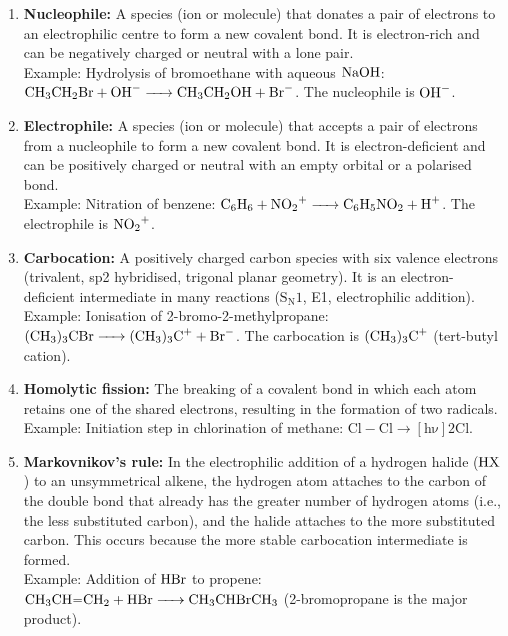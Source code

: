 \documentclass[11pt]{article}
\begin{document}
\begin{corrige}
\begin{enumerate}
\item \textbf{Nucleophile:} A species (ion or molecule) that donates a pair of electrons to an electrophilic centre to form a new covalent bond. It is electron-rich and can be negatively charged or neutral with a lone pair. \\
Example: Hydrolysis of bromoethane with aqueous \(\ce{NaOH}\): \(\ce{CH3CH2Br + OH- -> CH3CH2OH + Br-}\). The nucleophile is \(\ce{OH-}\).

\item \textbf{Electrophile:} A species (ion or molecule) that accepts a pair of electrons from a nucleophile to form a new covalent bond. It is electron-deficient and can be positively charged or neutral with an empty orbital or a polarised bond. \\
Example: Nitration of benzene: \(\ce{C6H6 + NO2+ -> C6H5NO2 + H+}\). The electrophile is \(\ce{NO2+}\).

\item \textbf{Carbocation:} A positively charged carbon species with six valence electrons (trivalent, sp2 hybridised, trigonal planar geometry). It is an electron-deficient intermediate in many reactions (\(\mathrm{S_N1}\), E1, electrophilic addition). \\
Example: Ionisation of 2-bromo-2-methylpropane: \(\ce{(CH3)3CBr -> (CH3)3C+ + Br-}\). The carbocation is \(\ce{(CH3)3C+}\) (tert-butyl cation).

\item \textbf{Homolytic fission:} The breaking of a covalent bond in which each atom retains one of the shared electrons, resulting in the formation of two radicals. \\
Example: Initiation step in chlorination of methane: \(\ensuremath{\mathrm{Cl-Cl \rightarrow [h\nu] 2 Cl.}}\)

\item \textbf{Markovnikov's rule:} In the electrophilic addition of a hydrogen halide (\(\ce{HX}\)) to an unsymmetrical alkene, the hydrogen atom attaches to the carbon of the double bond that already has the greater number of hydrogen atoms (i.e., the less substituted carbon), and the halide attaches to the more substituted carbon. This occurs because the more stable carbocation intermediate is formed. \\
Example: Addition of \(\ce{HBr}\) to propene: \(\ce{CH3CH=CH2 + HBr -> CH3CHBrCH3}\) (2-bromopropane is the major product).
\end{enumerate}
\end{corrige}
\end{document}
